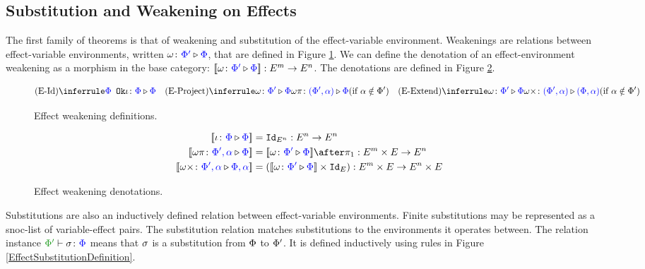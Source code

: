 \subsection{Substitution and Weakening on Effects}\label{SectionEffectSubstitution}

The first family of theorems is that of weakening and substitution of the effect-variable environment. Weakenings are relations between effect-variable environments, written $\wrel{\w}{\P'}{\P}$, that are defined in Figure \ref{EffectWeakeningDefinition}. We can define the denotation of an effect-environment weakening as a morphism in the base category: $\deno{\wrelw{\P'}{\P}}: E^m \rightarrow E^n$. The denotations are defined in Figure \ref{EffectWeakeningDenotations}.

\begin{figure}[H]
    \centering
    \begin{framed}
        \[
    \ntreeruleI{\eid}{\ok{\P}}{\wrel{\i}{\P}{\P}}
    \quad
    \condtreeruleI{\eproject}{\wrel{\w}{\P'}{\P}}{\wrel{\w\pi}{(\P', \a)}{\P}}{\a\notin\P'}
    \quad
    \condtreeruleI{\eextend}{\wrel{\w}{\P'}{\P}}{\wrel{\w\x}{(\P', \a)}{(\P, \a)}}{\a\notin\P'}
\]
    \end{framed}
    \caption{Effect weakening definitions.}
    \label{EffectWeakeningDefinition}
\end{figure}


\begin{figure}[H]
    \centering
    \begin{framed}
        \begin{align*}
            \deno{\wrel{\i}{\P}{\P}} & = \Id{E^n}: E^n \rightarrow E^n
            \\
            \deno{\wrel{\w\pi}{\P',\a}{\P}} & = \deno{\wrelw{\P'}{\P}}\after \p: E^m\times E\rightarrow E^n
            \\
            \deno{\wrel{\w\x}{\P',\a}{\P,\a}} & = (\deno{\wrelw{\P'}{\P}}\times \Id{E}): E^m\times E\rightarrow E^n\times E 
        \end{align*}
    \end{framed}
    \caption{Effect weakening denotations.}
    \label{EffectWeakeningDenotations}
\end{figure}

Substitutions are also an inductively defined relation between effect-variable environments. Finite substitutions may be represented as a snoc-list of variable-effect pairs. The substitution relation matches substitutions to the environments it operates between. The relation instance $\typerelation{\P'}{\si}{\P}$ means that $\si$ is a substitution from $\P$ to $\P'$. It is defined inductively using rules in Figure \ref{EffectSubstitutionDefinition}.

